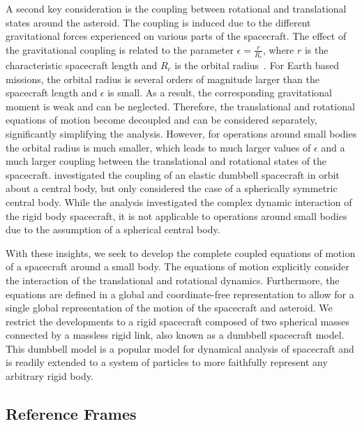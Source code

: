 A second key consideration is the coupling between rotational and translational states around the asteroid.
The coupling is induced due to the different gravitational forces experienced on various parts of the spacecraft.
The effect of the gravitational coupling is related to the parameter \(\epsilon = \frac{r}{R_c}\), where \(r\) is the characteristic spacecraft length and \(R_c\) is the orbital radius~\cite{hughes2004}.
For Earth based missions, the orbital radius is several orders of magnitude larger than the spacecraft length and \(\epsilon\) is small.
As a result, the corresponding gravitational moment is weak and can be neglected. 
Therefore, the translational and rotational equations of motion become decoupled and can be considered separately, significantly simplifying the analysis. 
However, for operations around small bodies the orbital radius is much smaller, which leads to much larger values of \(\epsilon\) and a much larger coupling between the translational and rotational states of the spacecraft.
\textcite{elmasri2005,sanyal2004} investigated the coupling of an elastic dumbbell spacecraft in orbit about a central body, but only considered the case of a spherically symmetric central body.
While the analysis investigated the complex dynamic interaction of the rigid body spacecraft, it is not applicable to operations around small bodies due to the assumption of a spherical central body.

With these insights, we seek to develop the complete coupled equations of motion of a spacecraft around a small body.
The equations of motion explicitly consider the interaction of the translational and rotational dynamics.
Furthermore, the equations are defined in a global and coordinate-free representation to allow for a single global representation of the motion of the spacecraft and asteroid.
We restrict the developments to a rigid spacecraft composed of two spherical masses connected by a massless rigid link, also known as a dumbbell spacecraft model.
This dumbbell model is a popular model for dynamical analysis of spacecraft and is readily extended to a system of particles to more faithfully represent any arbitrary rigid body.

\subsection{Reference Frames}\label{ssec:dumbbell_eoms_reference_frames}

